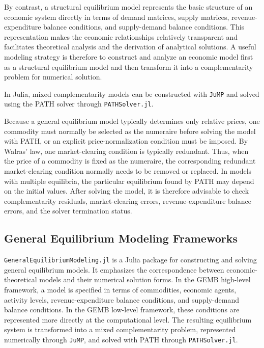 \documentclass[
  letterpaper,
  DIV=11,
  numbers=noendperiod]{scrreprt}
\begin{document}
By contrast, a structural equilibrium model represents the basic
structure of an economic system directly in terms of demand matrices,
supply matrices, revenue-expenditure balance conditions, and
supply-demand balance conditions. This representation makes the economic
relationships relatively transparent and facilitates theoretical
analysis and the derivation of analytical solutions. A useful modeling
strategy is therefore to construct and analyze an economic model first
as a structural equilibrium model and then transform it into a
complementarity problem for numerical solution.

In Julia, mixed complementarity models can be constructed with
\texttt{JuMP} and solved using the PATH solver through
\texttt{PATHSolver.jl}.

Because a general equilibrium model typically determines only relative
prices, one commodity must normally be selected as the numeraire before
solving the model with PATH, or an explicit price-normalization
condition must be imposed. By Walras' law, one market-clearing condition
is typically redundant. Thus, when the price of a commodity is fixed as
the numeraire, the corresponding redundant market-clearing condition
normally needs to be removed or replaced. In models with multiple
equilibria, the particular equilibrium found by PATH may depend on the
initial values. After solving the model, it is therefore advisable to
check complementarity residuals, market-clearing errors,
revenue-expenditure balance errors, and the solver termination status.

\subsection{General Equilibrium Modeling
Frameworks}\label{general-equilibrium-modeling-frameworks}

\texttt{GeneralEquilibriumModeling.jl} is a Julia package for
constructing and solving general equilibrium models. It emphasizes the
correspondence between economic-theoretical models and their numerical
solution forms. In the GEMB high-level framework, a model is specified
in terms of commodities, economic agents, activity levels,
revenue-expenditure balance conditions, and supply-demand balance
conditions. In the GEMB low-level framework, these conditions are
represented more directly at the computational level. The resulting
equilibrium system is transformed into a mixed complementarity problem,
represented numerically through \texttt{JuMP}, and solved with PATH
through \texttt{PATHSolver.jl}.
\end{document}
